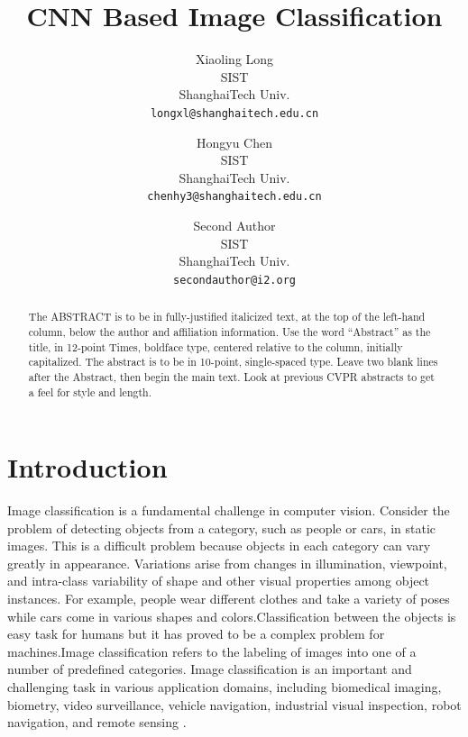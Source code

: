 \documentclass[10pt,twocolumn,letterpaper]{article}
\begin{document}
\title{	CNN Based Image Classification}

\author{Xiaoling Long\\
SIST\\
ShanghaiTech Univ.\\
{\tt\small longxl@shanghaitech.edu.cn}
\and
Hongyu Chen\\
SIST\\
ShanghaiTech Univ.\\
{\tt\small chenhy3@shanghaitech.edu.cn}
\and
Second Author\\
SIST\\
ShanghaiTech Univ.\\
{\tt\small secondauthor@i2.org}
}


\maketitle

\begin{abstract}
   The ABSTRACT is to be in fully-justified italicized text, at the top
   of the left-hand column, below the author and affiliation
   information. Use the word ``Abstract'' as the title, in 12-point
   Times, boldface type, centered relative to the column, initially
   capitalized. The abstract is to be in 10-point, single-spaced type.
   Leave two blank lines after the Abstract, then begin the main text.
   Look at previous CVPR abstracts to get a feel for style and length.
\end{abstract}

\section{Introduction}
Image classification is a fundamental challenge in computer vision\cite{felzenszwalb2013visual}. Consider the problem of detecting objects from a category, such as people or cars, in static images. This is a difficult problem because objects in each category can vary greatly in appearance. Variations arise from changes in illumination, viewpoint, and intra-class variability of shape and other visual properties among object instances. For example, people wear different clothes and take a variety of poses while cars come in various shapes and colors.Classification   between   the   objects   is   easy   task   for  humans  but  it  has  proved  to  be  a  complex  problem for machines.Image classification refers to the labeling of images into one of a number of predefined categories.
Image classification is an important and challenging task in various application domains, including biomedical imaging, biometry, video surveillance, vehicle navigation, industrial visual inspection, robot navigation, and remote sensing \cite{kamavisdar2013survey}.
\end{document}
